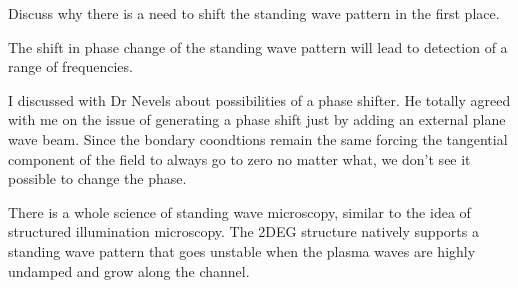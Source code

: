 \documentclass[11pt]{article}
\begin{document}
Discuss why there is a need to shift the standing wave pattern in the first place.

The shift in phase change of the standing wave pattern will lead to detection of a range of frequencies.

I discussed with Dr Nevels about possibilities of a phase shifter. He totally agreed with me on the issue of generating a phase shift just by adding an external plane wave beam. Since the bondary coondtions remain the same forcing the tangential component of the field to always go to zero no matter what, we don't see it possible to change the phase.

There is a whole science of standing wave microscopy, similar to the idea of structured illumination microscopy. The 2DEG structure natively supports a standing wave pattern that goes unstable when the plasma waves are highly undamped and grow along the channel.
\end{document}
